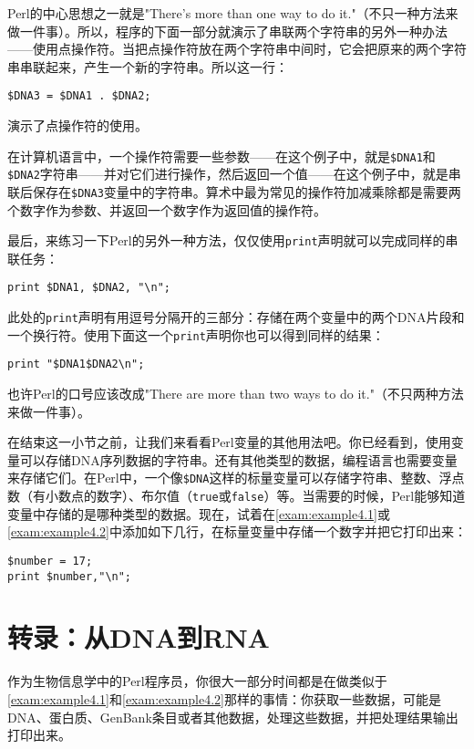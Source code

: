 Perl的中心思想之一就是"There's more than one way to do
it."（不只一种方法来做一件事）。所以，程序的下面一部分就演示了串联两个字符串的另外一种办法——使用点操作符。当把点操作符放在两个字符串中间时，它会把原来的两个字符串串联起来，产生一个新的字符串。所以这一行：

\begin{lstlisting}
$DNA3 = $DNA1 . $DNA2;
\end{lstlisting}
演示了点操作符的使用。

\begin{adjustwidth}{2cm}{2cm}
  在计算机语言中，一个操作符需要一些参数——在这个例子中，就是\verb|$DNA1|和\verb|$DNA2|字符串——并对它们进行操作，然后返回一个值——在这个例子中，就是串联后保存在\verb|$DNA3|变量中的字符串。算术中最为常见的操作符加减乘除都是需要两个数字作为参数、并返回一个数字作为返回值的操作符。
\end{adjustwidth}

最后，来练习一下Perl的另外一种方法，仅仅使用\verb|print|声明就可以完成同样的串联任务：

\begin{lstlisting}
print $DNA1, $DNA2, "\n";
\end{lstlisting}

此处的\verb|print|声明有用逗号分隔开的三部分：存储在两个变量中的两个DNA片段和一个换行符。使用下面这一个\verb|print|声明你也可以得到同样的结果：

\begin{lstlisting}
print "$DNA1$DNA2\n";
\end{lstlisting}

也许Perl的口号应该改成"There are more than two ways to do it."（不只两种方法来做一件事）。

在结束这一小节之前，让我们来看看Perl变量的其他用法吧。你已经看到，使用变量可以存储DNA序列数据的字符串。还有其他类型的数据，编程语言也需要变量来存储它们。在Perl中，一个像\verb|$DNA|这样的标量变量可以存储字符串、整数、浮点数（有小数点的数字）、布尔值（\verb|true|或\verb|false|）等。当需要的时候，Perl能够知道变量中存储的是哪种类型的数据。现在，试着在\autoref{exam:example4.1}或\autoref{exam:example4.2}中添加如下几行，在标量变量中存储一个数字并把它打印出来：

\begin{lstlisting}
$number = 17;
print $number,"\n";
\end{lstlisting}

\section{转录：从DNA到RNA}
作为生物信息学中的Perl程序员，你很大一部分时间都是在做类似于\autoref{exam:example4.1}和\autoref{exam:example4.2}那样的事情：你获取一些数据，可能是DNA、蛋白质、GenBank条目或者其他数据，处理这些数据，并把处理结果输出打印出来。

